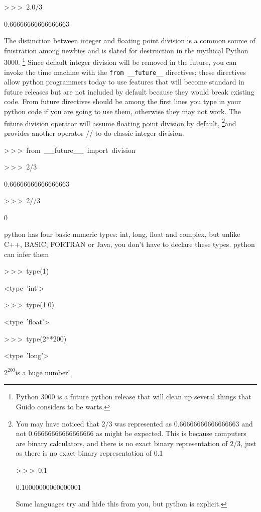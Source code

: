 \begin{lyxcode}
>\,{}>\,{}>~2.0/3

0.66666666666666663
\end{lyxcode}
The distinction between integer and floating point division is a common
source of frustration among newbies and is slated for destruction
in the mythical Python 3000.%
\footnote{Python 3000 is a future python release that will clean up several
things that Guido considers to be warts.%
} Since default integer division will be removed in the future, you
can invoke the time machine with the \texttt{from \_\_future\_\_}
directives; these directives allow python programmers today to use
features that will become standard in future releases but are not
included by default because they would break existing code. From future
directives should be among the first lines you type in your python
code if you are going to use them, otherwise they may not work. The
future division operator will assume floating point division by default,%
\footnote{You may have noticed that 2/3 was represented as 0.66666666666666663
and not 0.66666666666666666 as might be expected. This is because
computers are binary calculators, and there is no exact binary representation
of 2/3, just as there is no exact binary representation of 0.1

\begin{lyxcode}
>\,{}>\,{}>~0.1

0.10000000000000001
\end{lyxcode}
Some languages try and hide this from you, but python is explicit.%
}and provides another operator // to do classic integer division.

\begin{lyxcode}
>\,{}>\,{}>~from~\_\_future\_\_~import~division

>\,{}>\,{}>~2/3

0.66666666666666663

>\,{}>\,{}>~2//3

0
\end{lyxcode}
python has four basic numeric types: int, long, float and complex,
but unlike C++, BASIC, FORTRAN or Java, you don't have to declare
these types. python can infer them

\begin{lyxcode}
>\,{}>\,{}>~type(1)

<type~'int'>

>\,{}>\,{}>~type(1.0)

<type~'float'>

>\,{}>\,{}>~type(2{*}{*}200)

<type~'long'>


\end{lyxcode}
$2^{200}$is a huge number!

